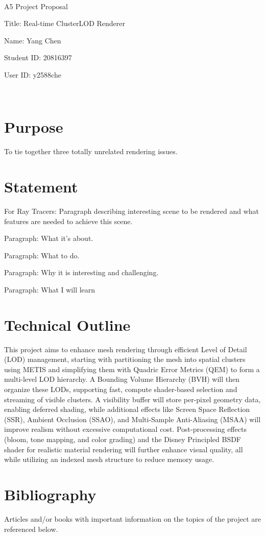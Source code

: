 \documentclass {article}
\begin{document}
~\vfill
\begin{center}
\Large

A5 Project Proposal

Title: Real-time ClusterLOD Renderer

Name: Yang Chen

Student ID: 20816397

User ID: y2588che
\end{center}
\vfill ~\vfill~
\newpage
\section{Purpose}
	To tie together three totally unrelated rendering issues.

\section{Statement}
	For Ray Tracers: Paragraph describing interesting scene to be
		rendered and what features are needed to achieve
		this scene.

	Paragraph: What it's about.

	Paragraph: What to do.

	Paragraph: Why it is interesting and challenging.

	Paragraph: What I will learn

\section{Technical Outline}
     This project aims to enhance mesh rendering through efficient Level of Detail (LOD) management, starting with partitioning 
     the mesh into spatial clusters using METIS and simplifying them with Quadric Error Metrics (QEM) to form a multi-level LOD 
     hierarchy. A Bounding Volume Hierarchy (BVH) will then organize these LODs, supporting fast, compute shader-based selection 
     and streaming of visible clusters. A visibility buffer will store per-pixel geometry data, enabling deferred shading, while 
     additional effects like Screen Space Reflection (SSR), Ambient Occlusion (SSAO), and Multi-Sample Anti-Aliasing (MSAA) will 
     improve realism without excessive computational cost. Post-processing effects (bloom, tone mapping, and color grading) and 
     the Disney Principled BSDF shader for realistic material rendering will further enhance visual quality, all while utilizing 
     an indexed mesh structure to reduce memory usage.

\section{Bibliography}
     Articles and/or books with important information on the topics of the project are referenced below.
     
\end{document}
